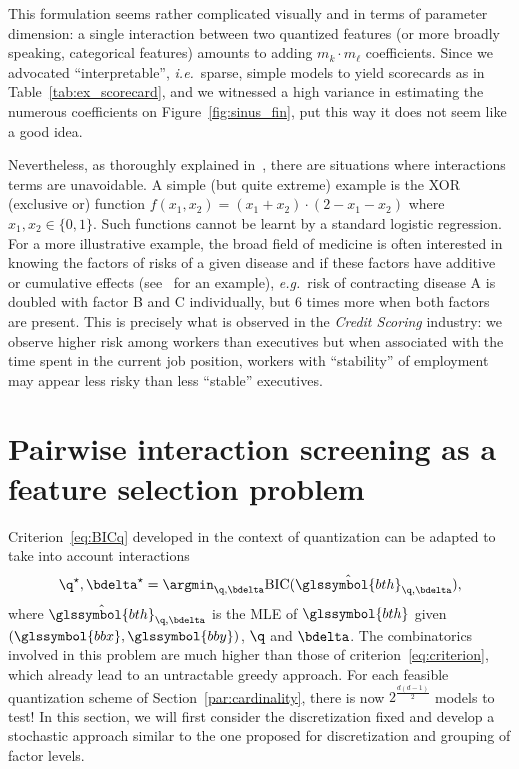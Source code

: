 This formulation seems rather complicated visually and in terms of parameter dimension: a single interaction between two quantized features (or more broadly speaking, categorical features) amounts to adding $m_k \cdot m_\ell$ coefficients. Since we advocated ``interpretable'', \textit{i.e.}\ sparse, simple models to yield scorecards as in Table~\ref{tab:ex_scorecard}, and we witnessed a high variance in estimating the numerous coefficients on Figure~\ref{fig:sinus_fin}, put this way it does not seem like a good idea.

Nevertheless, as thoroughly explained in~\cite{berry2010testing}, there are situations where interactions terms are unavoidable. A simple (but quite extreme) example is the XOR (exclusive or) function $f(x_1,x_2) = (x_1 + x_2)\cdot(2 - x_1 - x_2)$ where $x_1,x_2 \in \{0,1\}$. Such functions cannot be learnt by a standard logistic regression. For a more illustrative example, the broad field of medicine is often interested in knowing the factors of risks of a given disease and if these factors have additive or cumulative effects (see~\cite{morgan2014adversity} for an example), \textit{e.g.}\ risk of contracting disease A is doubled with factor B and C individually, but 6 times more when both factors are present. This is precisely what is observed in the \textit{Credit Scoring} industry: we observe higher risk among workers than executives but when associated with the time spent in the current job position, workers with ``stability'' of employment may appear less risky than less ``stable'' executives.


\section{Pairwise interaction screening as a feature selection problem}

Criterion~\eqref{eq:BICq} developed in the context of quantization can be adapted to take into account interactions
\begin{equation}\label{eq:criterion_inter}
\q^\star,\bdelta^\star = \argmin_{\q,\bdelta} \text{BIC}(\hat{\glssymbol{bth}}_{\q,\bdelta}),
\end{equation}
where $\hat{\glssymbol{bth}}_{\q,\bdelta}$ is the MLE of $\glssymbol{bth}$ given $(\glssymbol{bbx},\glssymbol{bby})$, $\q$ and $\bdelta$. The combinatorics involved in this problem are much higher than those of criterion~\eqref{eq:criterion}, which already lead to an untractable greedy approach. For each feasible quantization scheme of Section~\ref{par:cardinality}, there is now $2^{\frac{d(d-1)}{2}}$ models to test! In this section, we will first consider the discretization fixed and develop a stochastic approach similar to the one proposed for discretization and grouping of factor levels.

